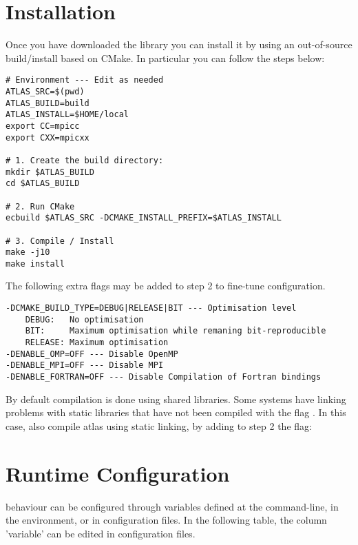 \section{Installation}
Once you have downloaded the library you can install it by using 
an out-of-source build/install based on CMake. In particular you 
can follow the steps below:
%
\begin{lstlisting}[style=BashStyle]
# Environment --- Edit as needed
ATLAS_SRC=$(pwd)
ATLAS_BUILD=build
ATLAS_INSTALL=$HOME/local
export CC=mpicc
export CXX=mpicxx

# 1. Create the build directory:
mkdir $ATLAS_BUILD
cd $ATLAS_BUILD

# 2. Run CMake
ecbuild $ATLAS_SRC -DCMAKE_INSTALL_PREFIX=$ATLAS_INSTALL

# 3. Compile / Install
make -j10
make install
\end{lstlisting}
%
The following extra flags may be added to step 2 to fine-tune 
configuration.
%
\begin{lstlisting}[style=BashStyle]
-DCMAKE_BUILD_TYPE=DEBUG|RELEASE|BIT --- Optimisation level
    DEBUG:   No optimisation
    BIT:     Maximum optimisation while remaning bit-reproducible
    RELEASE: Maximum optimisation
-DENABLE_OMP=OFF --- Disable OpenMP
-DENABLE_MPI=OFF --- Disable MPI
-DENABLE_FORTRAN=OFF --- Disable Compilation of Fortran bindings
\end{lstlisting}
%
%
\begin{notebox}
By default compilation is done using shared libraries. Some systems have 
linking problems with static libraries that have not been compiled with 
the flag . In this case, also compile atlas using static 
linking, by adding to step 2 the flag: 
\end{notebox}
%

\section{Runtime Configuration}

\Atlas behaviour can be configured through variables defined at the command-line, 
in the environment, or in configuration files. In the following table, the column 
'variable' can be edited in configuration files.

